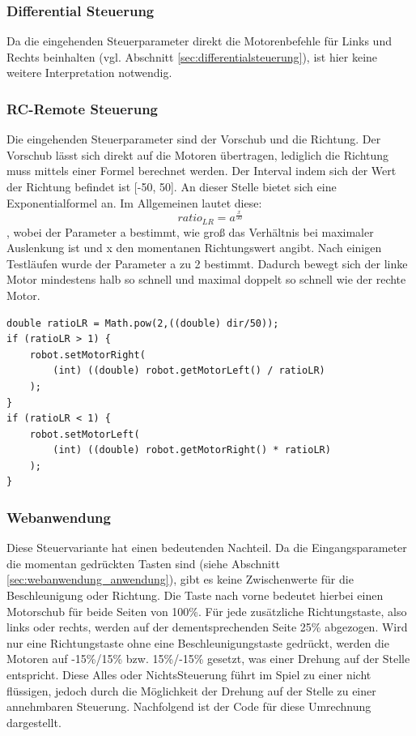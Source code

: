 \subsubsection{Differential Steuerung}
Da die eingehenden Steuerparameter direkt die Motorenbefehle für Links und Rechts beinhalten (vgl. Abschnitt \ref{sec:differentialsteuerung}), ist hier keine weitere Interpretation notwendig. 

\subsubsection{RC-Remote Steuerung}
\label{sec:rcremote_server}
Die eingehenden Steuerparameter sind der Vorschub und die Richtung. Der Vorschub lässt sich direkt auf die Motoren übertragen, lediglich die Richtung muss mittels einer Formel berechnet werden. Der Interval indem sich der Wert der Richtung befindet ist [-50, 50]. An dieser Stelle bietet sich eine Exponentialformel an. 
Im Allgemeinen lautet diese: 
{\Large \[ratio_{LR} = a^{\frac{x}{50}}\]},
wobei der Parameter a bestimmt, wie groß das Verhältnis bei maximaler Auslenkung ist und x den momentanen Richtungswert angibt.
Nach einigen Testläufen wurde der Parameter a zu 2 bestimmt. Dadurch bewegt sich der linke Motor mindestens halb so schnell und maximal doppelt so schnell wie der rechte Motor.

\begin{lstlisting}
double ratioLR = Math.pow(2,((double) dir/50));
if (ratioLR > 1) {
	robot.setMotorRight(
		(int) ((double) robot.getMotorLeft() / ratioLR)
	); 
}
if (ratioLR < 1) {
	robot.setMotorLeft(
		(int) ((double) robot.getMotorRight() * ratioLR)
	);
}
\end{lstlisting}


\subsubsection{Webanwendung}
\label{sec:webanwendung_server}
Diese Steuervariante hat einen bedeutenden Nachteil. Da die Eingangsparameter die momentan gedrückten Tasten sind (siehe Abschnitt \ref{sec:webanwendung_anwendung}), gibt es keine Zwischenwerte für die Beschleunigung oder Richtung. Die Taste nach vorne bedeutet hierbei einen Motorschub für beide Seiten von 100\%. Für jede zusätzliche Richtungstaste, also links oder rechts, werden auf der dementsprechenden Seite 25\% abgezogen. Wird nur eine Richtungstaste ohne eine Beschleunigungstaste gedrückt, werden die Motoren auf -15\%/15\% bzw. 15\%/-15\% gesetzt, was einer Drehung auf der Stelle entspricht. Diese \glqq Alles oder Nichts\grqq Steuerung führt im Spiel zu einer nicht flüssigen, jedoch durch die Möglichkeit der Drehung auf der Stelle zu einer annehmbaren Steuerung. Nachfolgend ist der Code für diese Umrechnung dargestellt.

